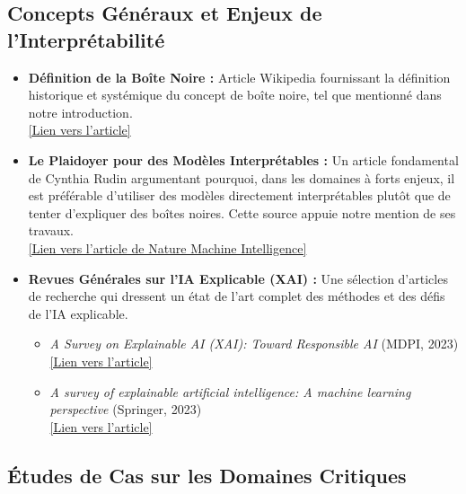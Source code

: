 \documentclass{article}
\begin{document}
\subsection*{Concepts Généraux et Enjeux de l'Interprétabilité}

\begin{itemize}
    \item \textbf{Définition de la Boîte Noire :} Article Wikipedia fournissant la définition historique et systémique du concept de boîte noire, tel que mentionné dans notre introduction. \\
    \href{https://fr.wikipedia.org/wiki/Boîte_noire_(système)}{[Lien vers l'article]}

    \item \textbf{Le Plaidoyer pour des Modèles Interprétables :} Un article fondamental de Cynthia Rudin argumentant pourquoi, dans les domaines à forts enjeux, il est préférable d'utiliser des modèles directement interprétables plutôt que de tenter d'expliquer des boîtes noires. Cette source appuie notre mention de ses travaux. \\
    \href{https://www.nature.com/articles/s42256-019-0133-z}{[Lien vers l'article de Nature Machine Intelligence]}

    \item \textbf{Revues Générales sur l'IA Explicable (XAI) :} Une sélection d'articles de recherche qui dressent un état de l'art complet des méthodes et des défis de l'IA explicable.
    \begin{itemize}
        \item \textit{A Survey on Explainable AI (XAI): Toward Responsible AI} (MDPI, 2023) \\
        \href{https://www.mdpi.com/2078-2489/14/8/426}{[Lien vers l'article]}
        \item \textit{A survey of explainable artificial intelligence: A machine learning perspective} (Springer, 2023) \\
        \href{https://link.springer.com/article/10.1007/s12559-023-10179-8}{[Lien vers l'article]}
    \end{itemize}
\end{itemize}

\subsection*{Études de Cas sur les Domaines Critiques}
\end{document}
